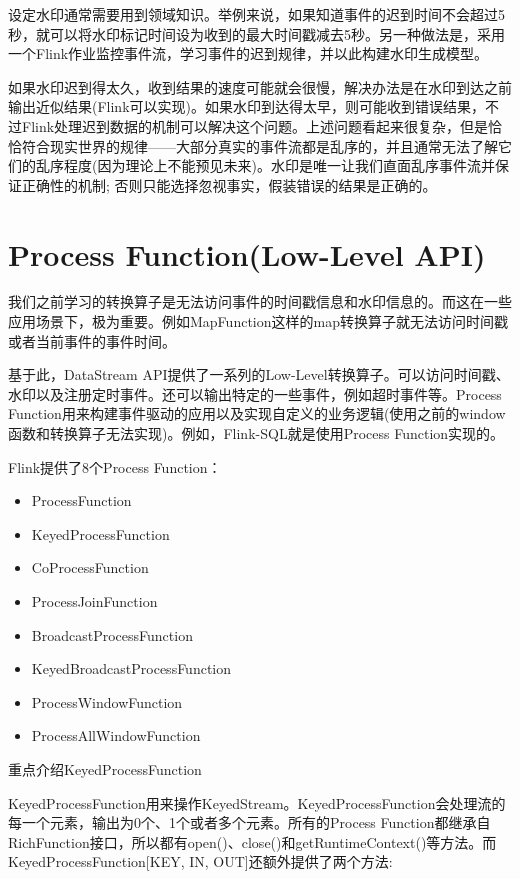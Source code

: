 \documentclass[oneside]{ctexbook}
\begin{document}
设定水印通常需要用到领域知识。举例来说，如果知道事件的迟到时间不会超过5秒，就可以将水印标记时间设为收到的最大时间戳减去5秒。另一种做法是，采用一个Flink作业监控事件流，学习事件的迟到规律，并以此构建水印生成模型。

如果水印迟到得太久，收到结果的速度可能就会很慢，解决办法是在水印到达之前输出近似结果(Flink可以实现)。如果水印到达得太早，则可能收到错误结果，不过Flink处理迟到数据的机制可以解决这个问题。上述问题看起来很复杂，但是恰恰符合现实世界的规律——大部分真实的事件流都是乱序的，并且通常无法了解它们的乱序程度(因为理论上不能预见未来)。水印是唯一让我们直面乱序事件流并保证正确性的机制; 否则只能选择忽视事实，假装错误的结果是正确的。

\section{Process Function(Low-Level API)}

我们之前学习的转换算子是无法访问事件的时间戳信息和水印信息的。而这在一些应用场景下，极为重要。例如MapFunction这样的map转换算子就无法访问时间戳或者当前事件的事件时间。

基于此，DataStream API提供了一系列的Low-Level转换算子。可以访问时间戳、水印以及注册定时事件。还可以输出特定的一些事件，例如超时事件等。Process Function用来构建事件驱动的应用以及实现自定义的业务逻辑(使用之前的window函数和转换算子无法实现)。例如，Flink-SQL就是使用Process Function实现的。

Flink提供了8个Process Function：

\begin{itemize}
\item ProcessFunction
\item KeyedProcessFunction
\item CoProcessFunction
\item ProcessJoinFunction
\item BroadcastProcessFunction
\item KeyedBroadcastProcessFunction
\item ProcessWindowFunction
\item ProcessAllWindowFunction
\end{itemize}

重点介绍KeyedProcessFunction

KeyedProcessFunction用来操作KeyedStream。KeyedProcessFunction会处理流的每一个元素，输出为0个、1个或者多个元素。所有的Process Function都继承自RichFunction接口，所以都有open()、close()和getRuntimeContext()等方法。而KeyedProcessFunction[KEY, IN, OUT]还额外提供了两个方法:
\end{document}
